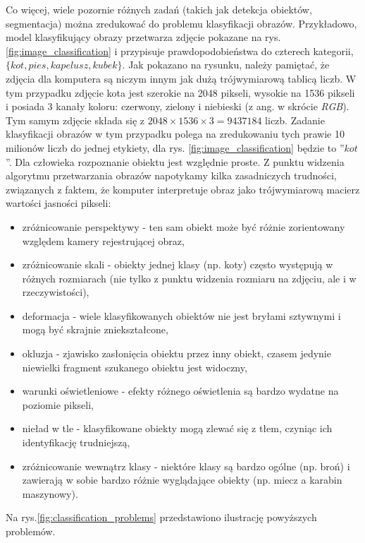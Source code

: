 Co więcej, wiele pozornie różnych zadań (takich jak detekcja obiektów, segmentacja) można zredukować do problemu klasyfikacji obrazów.
Przykładowo, model klasyfikujący obrazy przetwarza zdjęcie pokazane na rys. \ref{fig:image_classification} i przypisuje prawdopodobieństwa do czterech kategorii, $\lbrace kot, pies, kapelusz, kubek \rbrace$.
Jak pokazano na rysunku, należy pamiętać, że zdjęcia dla komputera są niczym innym jak dużą trójwymiarową tablicą liczb.
W tym przypadku zdjęcie kota jest szerokie na 2048 pikseli, wysokie na 1536 pikseli i posiada 3 kanały koloru: czerwony, zielony i niebieski (z ang. w skrócie \textit{RGB}).
Tym samym zdjęcie składa się z $2048 \times 1536 \times 3 = 9437184$ liczb.
Zadanie klasyfikacji obrazów w tym przypadku polega na zredukowaniu tych prawie 10 milionów liczb do jednej etykiety, dla rys. \ref{fig:image_classification} będzie to ''$kot$''.
Dla człowieka rozpoznanie obiektu jest względnie proste. Z punktu widzenia algorytmu przetwarzania obrazów napotykamy kilka zasadniczych trudności, związanych z faktem, że komputer interpretuje obraz jako trójwymiarową macierz wartości jasności pikseli:
\begin{itemize}
	\item zróżnicowanie perspektywy - ten sam obiekt może być różnie zorientowany względem kamery rejestrującej obraz,
	\item zróżnicowanie skali - obiekty jednej klasy (np. koty) często występują w różnych rozmiarach (nie tylko z punktu widzenia rozmiaru na zdjęciu, ale i w rzeczywistości),
	\item deformacja - wiele klasyfikowanych obiektów nie jest bryłami sztywnymi i mogą być skrajnie zniekształcone,
	\item okluzja - zjawisko zasłonięcia obiektu przez inny obiekt, czasem jedynie niewielki fragment szukanego obiektu jest widoczny,
	\item warunki oświetleniowe - efekty różnego oświetlenia są bardzo wydatne na poziomie pikseli,
	\item nieład w tle - klasyfikowane obiekty mogą zlewać się z tłem, czyniąc ich identyfikację trudniejszą,
	\item zróżnicowanie wewnątrz klasy - niektóre klasy są bardzo ogólne (np. broń) i zawierają w sobie bardzo różnie wyglądające obiekty (np. miecz a karabin maszynowy).
\end{itemize}
Na rys.\ref{fig:classification_problems} przedstawiono ilustrację powyższych problemów.

